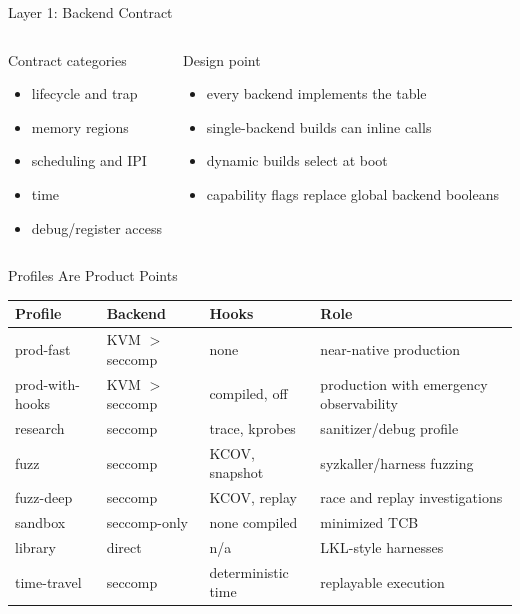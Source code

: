 \documentclass[aspectratio=169,11pt]{beamer}
\begin{document}
\begin{frame}{Layer 1: Backend Contract}
\begin{columns}[T,onlytextwidth]
\begin{block}{Contract categories}
\begin{itemize}
  \item lifecycle and trap
  \item memory regions
  \item scheduling and IPI
  \item time
  \item debug/register access
\end{itemize}
\end{block}
\begin{block}{Design point}
\begin{itemize}
  \item every backend implements the table
  \item single-backend builds can inline calls
  \item dynamic builds select at boot
  \item capability flags replace global backend booleans
\end{itemize}
\end{block}
\end{columns}
\end{frame}

\begin{frame}{Profiles Are Product Points}
\scriptsize
\begin{tabularx}{\textwidth}{@{}p{}p{}p{}X@{}}
\toprule
Profile & Backend & Hooks & Role \\
\midrule
prod-fast & KVM $>$ seccomp & none & near-native production \\
prod-with-hooks & KVM $>$ seccomp & compiled, off & production with emergency observability \\
research & seccomp & trace, kprobes & sanitizer/debug profile \\
fuzz & seccomp & KCOV, snapshot & syzkaller/harness fuzzing \\
fuzz-deep & seccomp & KCOV, replay & race and replay investigations \\
sandbox & seccomp-only & none compiled & minimized TCB \\
library & direct & n/a & LKL-style harnesses \\
time-travel & seccomp & deterministic time & replayable execution \\
\bottomrule
\end{tabularx}
\end{frame}
\end{document}
